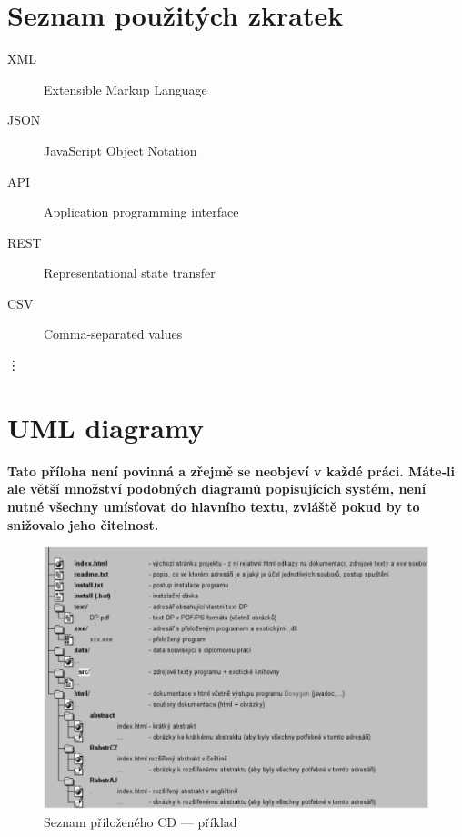 \documentclass[11pt,twoside,a4paper]{book}
\begin{document}
\chapter{Seznam použitých zkratek}

\begin{description}
\item[XML] Extensible Markup Language
\item[JSON] JavaScript Object Notation
\item[API] Application programming interface
\item[REST] Representational state transfer
\item[CSV] Comma-separated values
\end{description}
\vdots

\chapter{UML diagramy}
\textbf{\large Tato příloha není povinná a zřejmě se neobjeví v každé práci. Máte-li ale větší množství podobných diagramů popisujících systém, není nutné všechny umísťovat do hlavního textu, zvláště pokud by to snižovalo jeho čitelnost.}

\begin{figure}[h]
\begin{center}
\includegraphics[width=14cm]{figures/seznamcd}
\caption{Seznam přiloženého CD --- příklad}
\label{fig:seznamcd}
\end{center}
\end{figure}
\end{document}
